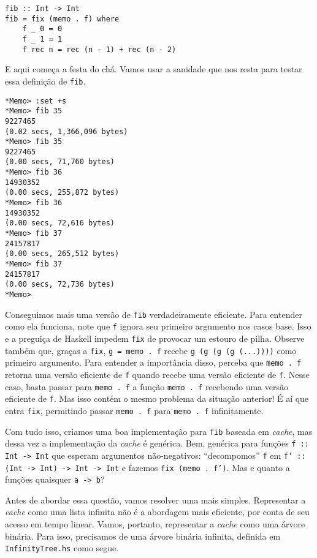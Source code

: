 \documentclass[a4paper]{article}
\begin{document}
\begin{verbatim}
fib :: Int -> Int
fib = fix (memo . f) where
	f _ 0 = 0
	f _ 1 = 1
	f rec n = rec (n - 1) + rec (n - 2)
\end{verbatim}

E aqui começa a festa do chá.
Vamos usar a sanidade que nos resta para testar essa definição de \texttt{fib}.

\begin{verbatim}
*Memo> :set +s
*Memo> fib 35
9227465
(0.02 secs, 1,366,096 bytes)
*Memo> fib 35
9227465
(0.00 secs, 71,760 bytes)
*Memo> fib 36
14930352
(0.00 secs, 255,872 bytes)
*Memo> fib 36
14930352
(0.00 secs, 72,616 bytes)
*Memo> fib 37
24157817
(0.00 secs, 265,512 bytes)
*Memo> fib 37
24157817
(0.00 secs, 72,736 bytes)
*Memo>
\end{verbatim}

Conseguimos mais uma versão de \texttt{fib} verdadeiramente eficiente.
Para entender como ela funciona, note que \texttt{f} ignora seu primeiro argumento nos casos base.
Isso e a preguiça de Haskell impedem \texttt{fix} de provocar um estouro de pilha.
Observe também que, graças a \texttt{fix}, \mbox{\texttt{g = memo . f}} recebe \texttt{g (g (g (g (...))))} como primeiro argumento.
Para entender a importância disso, perceba que \texttt{memo . f} retorna uma versão eficiente de \texttt{f} quando recebe uma versão eficiente de \texttt{f}.
Nesse caso, basta passar para \texttt{memo . f} a função \texttt{memo . f} recebendo uma versão eficiente de \texttt{f}.
Mas isso contém o mesmo problema da situação anterior!
É aí que entra \texttt{fix}, permitindo passar \texttt{memo . f} para \texttt{memo . f} infinitamente.

Com tudo isso, criamos uma boa implementação para \texttt{fib} baseada em \emph{cache}, mas dessa vez a implementação da \emph{cache} é genérica.
Bem, genérica para funções \texttt{f :: Int -> Int} que esperam argumentos não-negativos: ``decompomos'' \texttt{f} em \mbox{\texttt{f' :: (Int -> Int) -> Int -> Int}} e fazemos \texttt{fix (memo . f')}.
Mas e quanto a funções quaisquer \texttt{a -> b}?

Antes de abordar essa questão, vamos resolver uma mais simples.
Representar a \emph{cache} como uma lista infinita não é a abordagem mais eficiente, por conta de seu acesso em tempo linear.
Vamos, portanto, representar a \emph{cache} como uma árvore binária.
Para isso, precisamos de uma árvore binária infinita, definida em \texttt{InfinityTree.hs} como segue.
\end{document}
